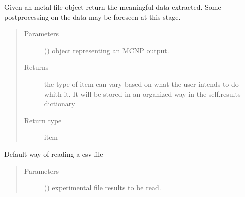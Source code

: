 \documentclass[letterpaper,10pt,english]{sphinxmanual}
\begin{document}
\begin{fulllineitems}
\begin{fulllineitems}
\end{fulllineitems}


\begin{fulllineitems}
\label{\detokenize{api/postprocessing:expoutput.ExperimentalOutput._processMCNPdata}}
\sphinxAtStartPar
Given an mctal file object return the meaningful data extracted. Some
post\sphinxhyphen{}processing on the data may be foreseen at this stage.
\begin{quote}\begin{description}
\item[{Parameters}] \leavevmode
\sphinxAtStartPar
{} ({\hyperref[\detokenize{api/postprocessing:output.MCNPoutput}]{}}) \textendash{} object representing an MCNP output.

\item[{Returns}] \leavevmode
\sphinxAtStartPar
the type of item can vary based on what the user intends to do
whith it. It will be stored in an organized way in the self.results
dictionary

\item[{Return type}] \leavevmode
\sphinxAtStartPar
item

\end{description}\end{quote}

\end{fulllineitems}


\begin{fulllineitems}
\label{\detokenize{api/postprocessing:expoutput.ExperimentalOutput._read_exp_file}}
\sphinxAtStartPar
Default way of reading a csv file
\begin{quote}\begin{description}
\item[{Parameters}] \leavevmode
\sphinxAtStartPar
{} () \textendash{} experimental file results to be read.


\end{description}
\end{quote}
\end{fulllineitems}
\end{fulllineitems}
\end{document}
